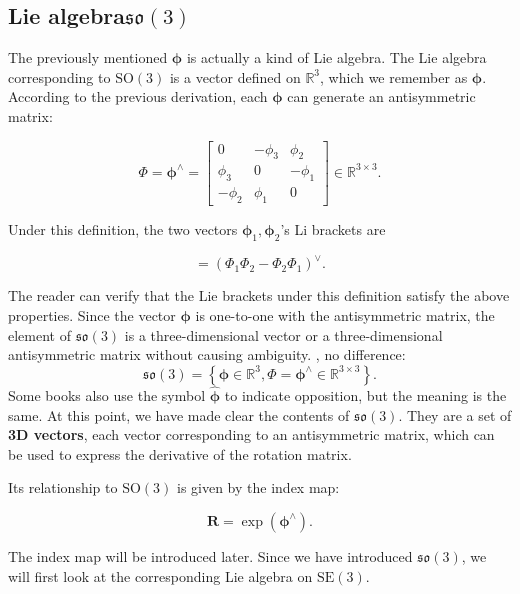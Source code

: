 \subsection{Lie algebra$\mathfrak{so}(3)$}

The previously mentioned $\boldsymbol{\phi}$ is actually a kind of Lie algebra.
The Lie algebra corresponding to $\mathrm{SO}(3)$ is a vector defined on $\mathbb{R}^3$, which we remember as $\boldsymbol{\phi}$.
According to the previous derivation, each $\boldsymbol{\phi}$ can generate an antisymmetric matrix:

\begin{equation}
\label{eq:phi}
\boldsymbol{\varPhi} = \boldsymbol{\phi}^{\wedge} = \left[ {\begin{array}{*{20}{c}}
0&{ - {\phi _3}}&{{\phi _2}}\\
{{\phi _3}}&0&{ - {\phi _1}}\\
{ - {\phi _2}}&{{\phi _1}}&0
\end{array}} \right] \in \mathbb{R}^{3 \times 3}.
\end{equation}

Under this definition, the two vectors $\boldsymbol{\phi}_1, \boldsymbol{\phi}_2$'s Li brackets are

\begin{equation}
[\boldsymbol{\phi}_1, \boldsymbol{\phi}_2] = \left( \bm{ \varPhi }_1 \bm{ \varPhi }_2 - \bm{ \varPhi }_2 \bm{ \varPhi }_1 \right)^\vee.
\end{equation}

The reader can verify that the Lie brackets under this definition satisfy the above properties. Since the vector $\boldsymbol{\phi}$ is one-to-one with the antisymmetric matrix, the element of $\mathfrak{so}(3)$ is a three-dimensional vector or a three-dimensional antisymmetric matrix without causing ambiguity. , no difference:
\begin{equation}
\mathfrak{so}(3) = \left\{ \boldsymbol{\phi} \in \mathbb{R}^3, \boldsymbol{\varPhi} = \boldsymbol{\phi^\wedge} \in \mathbb{ R}^{3 \times 3} \right\}.
\end{equation}
Some books also use the symbol $\widehat{\boldsymbol{\phi}}$ to indicate opposition, but the meaning is the same.
At this point, we have made clear the contents of $\mathfrak{so}(3)$.
They are a set of \textbf{3D vectors}, each vector corresponding to an antisymmetric matrix, which can be used to express the derivative of the rotation matrix.

Its relationship to $\mathrm{SO}(3)$ is given by the index map:

\begin{equation}
\bm{R} = \exp ( \boldsymbol{\phi}^\wedge ).
\end{equation}

The index map will be introduced later.
Since we have introduced $\mathfrak{so}(3)$, we will first look at the corresponding Lie algebra on $\mathrm{SE}(3)$.

